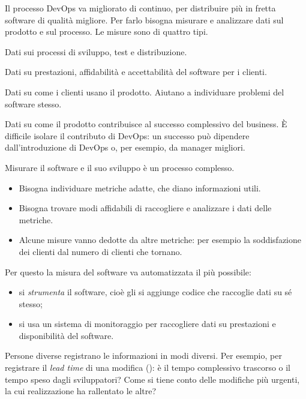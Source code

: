 Il processo DevOps va migliorato di continuo, per distribuire più in fretta software di qualità migliore. Per farlo
bisogna misurare e analizzare dati sul prodotto e sul processo. Le misure sono di quattro tipi.
\begin{description}[leftmargin=0pt, style=unboxed]
  \item[Process measurements.] Dati sui processi di sviluppo, test e distribuzione.
  \item[Service measurements.] Dati su prestazioni, affidabilità e accettabilità del software per i clienti.
  \item[Usage measurements.] Dati su come i clienti usano il prodotto. Aiutano a individuare problemi del software
    stesso.
  \item[Business success measurements.] Dati su come il prodotto contribuisce al successo complessivo del business. È
    difficile isolare il contributo di DevOps: un successo può dipendere dall'introduzione di DevOps o, per esempio, da
    manager migliori.
\end{description}

Misurare il software e il suo sviluppo è un processo complesso.
\begin{itemize}
  \item Bisogna individuare metriche adatte, che diano informazioni utili.
  \item Bisogna trovare modi affidabili di raccogliere e analizzare i dati delle metriche.
  \item Alcune misure vanno dedotte da altre metriche: per esempio la soddisfazione dei clienti dal numero di clienti
    che tornano.
\end{itemize}
Per questo la misura del software va automatizzata il più possibile:
\begin{itemize}
  \item si \emph{strumenta} il software, cioè gli si aggiunge codice che raccoglie dati su sé stesso;
  \item si usa un sistema di monitoraggio per raccogliere dati su prestazioni e disponibilità del software.
\end{itemize}

\begin{attenzione}
Persone diverse registrano le informazioni in modi diversi. Per esempio, per registrare il \emph{lead time} di una
modifica (): è il tempo complessivo trascorso o il tempo speso dagli sviluppatori? Come si
tiene conto delle modifiche più urgenti, la cui realizzazione ha rallentato le altre?
\end{attenzione}

